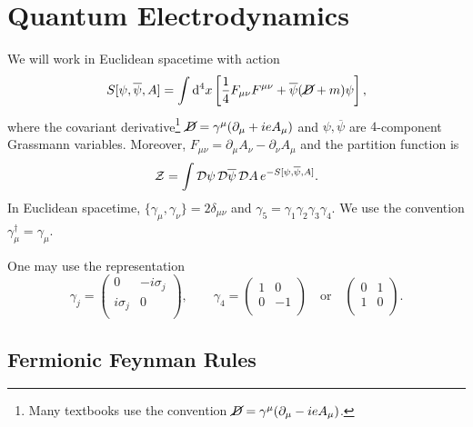 \chapter{Quantum Electrodynamics}%
\label{cha:quantum_electrodynamics}

We will work in Euclidean spacetime with action
\begin{equation}
  S[\psi, \overline{\psi}{}, A] = \int \dd[4]{x} \left[ \frac{1}{4} F_{\mu\nu} F^{\mu\nu} + \overline{\psi}{}(\cancel{D} + m) \psi \right],
\end{equation}
where the covariant derivative\footnote{Many textbooks use the convention $\cancel{D} = \gamma^{\mu} ( \partial_{\mu} -i e A_{\mu})$.} $\cancel{D} = \gamma^{\mu} (\partial_{\mu} + i e A_{\mu})$ and $\psi, \overline{\psi}{}$ are $4$-component Grassmann variables. Moreover, $F_{\mu\nu} = \partial_{\mu} A_{\nu} - \partial_{\nu} A_{\mu}$ and the partition function is
\begin{equation}
  \mathcal{Z} = \int \mathop{\mathcal{D} \psi} \mathop{\mathcal{D} \overline{\psi}{}} \mathop{\mathcal{D} A} e^{-S[\psi, \overline{\psi}{}, A]}.
\end{equation}
In Euclidean spacetime, $\{\gamma_{\mu}, \gamma_{\nu}\} = 2 \delta_{\mu\nu}$ and $\gamma_5 = \gamma_1 \gamma_2 \gamma_3 \gamma_4$. We use the convention $\gamma_{\mu}^{\dagger} = \gamma_{\mu}$.
\begin{example}[]
  One may use the representation
  \begin{equation}
    \gamma_j = 
    \begin{pmatrix}
     0 & -i \sigma_j \\
     i \sigma_j & 0 \\
    \end{pmatrix}, \qquad 
    \gamma_4  =
    \begin{pmatrix}
     1 & 0 \\
     0 & -1 \\
    \end{pmatrix} \quad \text{or} \quad
    \begin{pmatrix}
     0 & 1 \\
     1 & 0 \\
    \end{pmatrix}.
  \end{equation}
\end{example}

\section{Fermionic Feynman Rules}%
\label{sec:fermionic_feynman_rules}

